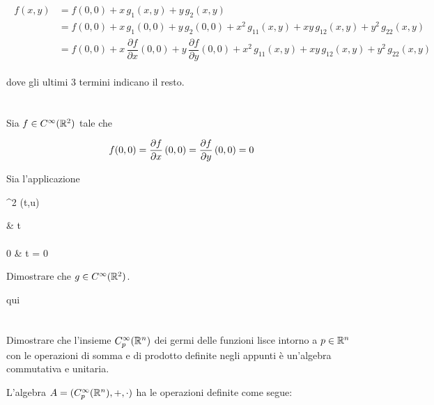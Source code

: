 \begin{align}
	\begin{split}
		f(x,y) &= f(0,0) + x \, g_{1} (x,y) + y \, g_{2} (x,y)\\
		&= f(0,0) + x \, g_{1} (0,0) + y \, g_{2} (0,0) + x^{2} \, g_{11}(x,y) + x y \, g_{12}(x,y) + y^{2} \, g_{22}(x,y)\\
		&= f(0,0) + x \, \dfrac{\partial f}{\partial x} (0,0) + y \, \dfrac{\partial f}{\partial y} (0,0) + x^{2} \, g_{11}(x,y) + x y \, g_{12}(x,y) + y^{2} \, g_{22}(x,y)
	\end{split}
\end{align}

dove gli ultimi 3 termini indicano il resto.

\tocless\section{}\label{es1-6}

\begin{tcolorbox}
	Sia $ f \in C^{\infty} (\mathbb{R}^{2}) $ tale che
	
	\begin{equation}
		f(0,0) = \pdv{f}{x} \, (0,0) = \pdv{f}{y} \, (0,0) = 0
	\end{equation}

	Sia l'applicazione
	
		{\R^{2}}{\R}
		{(t,u)}{%
			\begin{cases}
				 & t \neq 0\\\\
				0 & t = 0
			\end{cases}
			}
	
	Dimostrare che $ g \in C^{\infty}(\mathbb{R}^{2}) $.
\end{tcolorbox}

qui

\tocless\section{}\label{es1-7}

\begin{tcolorbox}
	Dimostrare che l'insieme $ C_{p}^{\infty}(\mathbb{R}^{n}) $ dei germi delle funzioni lisce intorno a $ p \in \mathbb{R}^{n} $ con le operazioni di somma e di prodotto definite negli appunti è un'algebra commutativa e unitaria.
\end{tcolorbox}

L'algebra $ A = (C_{p}^{\infty}(\mathbb{R}^{n}),+,\cdot) $ ha le operazioni definite come segue:

